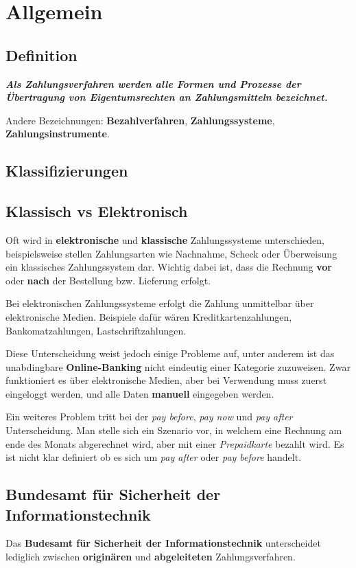 \section{Allgemein}
\subsection{Definition}
\textit{\textbf{Als Zahlungsverfahren werden alle Formen und Prozesse der Übertragung von Eigentumsrechten an Zahlungsmitteln bezeichnet.}}

Andere Bezeichnungen: \textbf{Bezahlverfahren}, \textbf{Zahlungssysteme}, \textbf{Zahlungsinstrumente}.

\subsection{Klassifizierungen}
\subsection{Klassisch vs Elektronisch}
Oft wird in \textbf{elektronische} und \textbf{klassische} Zahlungssysteme unterschieden, beispielsweise stellen Zahlungsarten wie Nachnahme, Scheck oder Überweisung ein klassisches Zahlungssystem dar. Wichtig dabei ist, dass die Rechnung \textbf{vor} oder \textbf{nach} der Bestellung bzw. Lieferung erfolgt. 

Bei elektronischen Zahlungssysteme erfolgt die Zahlung unmittelbar über elektronische Medien. Beispiele dafür wären Kreditkartenzahlungen, Bankomatzahlungen, Lastschriftzahlungen. 

Diese Unterscheidung weist jedoch einige Probleme auf, unter anderem ist das unabdingbare \textbf{Online-Banking} nicht eindeutig einer Kategorie zuzuweisen. Zwar funktioniert es über elektronische Medien, aber bei Verwendung muss zuerst eingeloggt werden, und alle Daten \textbf{manuell} eingegeben werden. 

Ein weiteres Problem tritt bei der \textit{pay before}, \textit{pay now} und \textit{pay after} Unterscheidung. Man stelle sich ein Szenario vor, in welchem eine Rechnung am ende des Monats abgerechnet wird, aber mit einer \textit{Prepaidkarte} bezahlt wird. Es ist nicht klar definiert ob es sich um \textit{pay after} oder \textit{pay before} handelt.

\subsection{Bundesamt für Sicherheit der Informationstechnik}
Das \textbf{Budesamt für Sicherheit der Informationstechnik} unterscheidet lediglich zwischen \textbf{originären} und \textbf{abgeleiteten} Zahlungsverfahren.

